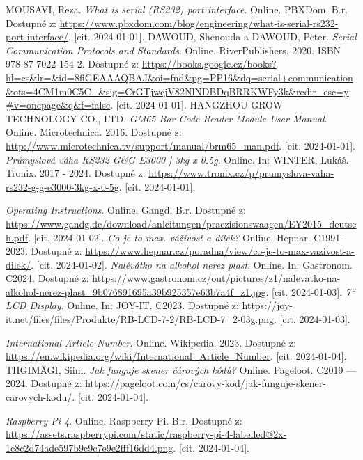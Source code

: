 \begin{thebibliography}{19}
MOUSAVI, Reza. \textit{What is serial (RS232) port interface}. Online. PBXDom. B.r. Dostupné z: \url{https://www.pbxdom.com/blog/engineering/what-is-serial-rs232-port-interface/}. [cit. 2024-01-01].
DAWOUD, Shenouda a DAWOUD, Peter. \textit{Serial Communication Protocols and Standards}. Online. RiverPublishers, 2020. ISBN 978-87-7022-154-2. Dostupné z: \url{https://books.google.cz/books?hl=cs&lr=&id=8fiGEAAAQBAJ&oi=fnd&pg=PP16&dq=serial+communication&ots=4CM1m0C5C\_&sig=CrGTjwcjV82NlNDBDqBRRKWFy3k&redir\_esc=y\#v=onepage&q&f=false}. [cit. 2024-01-01].
HANGZHOU GROW TECHNOLOGY CO., LTD. \textit{GM65 Bar Code Reader Module User Manual}. Online. Microtechnica. 2016. Dostupné z: \url{http://www.microtechnica.tv/support/manual/brm65\_man.pdf}. [cit. 2024-01-01].
\textit{Průmyslová váha RS232 G\&G E3000 | 3kg x 0.5g}. Online. In: WINTER, Lukáš. Tronix. 2017 - 2024. Dostupné z: \url{https://www.tronix.cz/p/prumyslova-vaha-rs232-g-g-e3000-3kg-x-0-5g}. [cit. 2024-01-01].

\textit{Operating Instructions}. Online. Gangd. B.r. Dostupné z: \url{https://www.gandg.de/download/anleitungen/praezisionswaagen/EY2015\_deutsch.pdf}. [cit. 2024-01-02].
\textit{Co je to max. váživost a dílek?} Online. Hepnar. C1991-2023. Dostupné z: \url{https://www.hepnar.cz/poradna/view/co-je-to-max-vazivost-a-dilek/}. [cit. 2024-01-02].
\textit{Nalévátko na alkohol nerez plast}. Online. In: Gastronom. C2024. Dostupné z: \url{https://www.gastronom.cz/out/pictures/z1/nalevatko-na-alkohol-nerez-plast\_9b076891695a39b925357e63b7a4f\_z1.jpg}. [cit. 2024-01-03].
\textit{7`` LCD Display}. Online. In: JOY-IT. C2023. Dostupné z: \url{https://joy-it.net/files/files/Produkte/RB-LCD-7-2/RB-LCD-7\_2-03g.png}. [cit. 2024-01-03].

\textit{International Article Number}. Online. Wikipedia. 2023. Dostupné z: \url{https://en.wikipedia.org/wiki/International\_Article\_Number}. [cit. 2024-01-04].
TIIGIMÄGI, Siim. \textit{Jak funguje skener čárových kódů?} Online. Pageloot. C2019 --- 2024. Dostupné z: \url{https://pageloot.com/cs/carovy-kod/jak-funguje-skener-carovych-kodu/}. [cit. 2024-01-04].


\textit{Raspberry Pi 4}. Online. Raspberry Pi. B.r. Dostupné z: \url{https://assets.raspberrypi.com/static/raspberry-pi-4-labelled@2x-1c8c2d74ade597b9c9c7e9e2fff16dd4.png}. [cit. 2024-01-04].

\end{thebibliography}